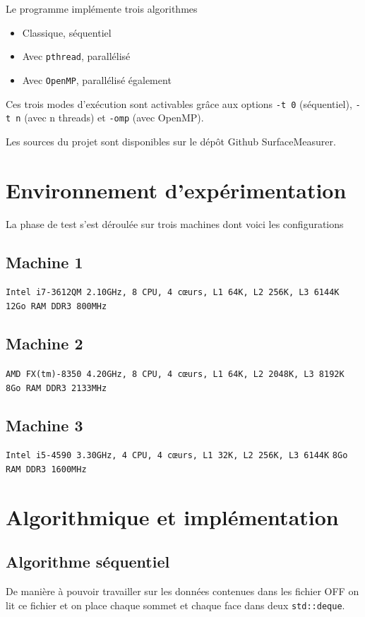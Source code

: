 \documentclass[a4paper]{article}
\begin{document}
Le programme implémente trois algorithmes
\begin{itemize}
	\item Classique, séquentiel
	\item Avec \texttt{pthread}\cite{pthreads}, parallélisé
	\item Avec \texttt{OpenMP}, parallélisé également
\end{itemize}
Ces trois modes d'exécution sont activables grâce aux options \texttt{-t 0} (séquentiel), \texttt{-t n} (avec n threads) et \texttt{-omp} (avec OpenMP).

Les sources du projet sont disponibles sur le dépôt Github SurfaceMeasurer\cite{github}.

\section{Environnement d'expérimentation}
La phase de test s'est déroulée sur trois machines dont voici les configurations

\subsection{Machine 1}
\texttt{Intel i7-3612QM 2.10GHz, 8 CPU, 4 cœurs, L1 64K, L2 256K, L3 6144K}
\texttt{12Go RAM DDR3 800MHz}

\subsection{Machine 2}
\texttt{AMD FX(tm)-8350 4.20GHz, 8 CPU, 4 cœurs, L1 64K, L2 2048K, L3 8192K}
\texttt{8Go RAM DDR3 2133MHz}

\subsection{Machine 3}
\texttt{Intel i5-4590 3.30GHz, 4 CPU, 4 cœurs, L1 32K, L2 256K, L3 6144K}
\texttt{8Go RAM DDR3 1600MHz}

\section{Algorithmique et implémentation}
	\subsection{Algorithme séquentiel}
		De manière à pouvoir travailler sur les données contenues dans les fichier OFF on lit ce fichier et on place chaque sommet et chaque face dans deux \texttt{std::deque}.
\end{document}
